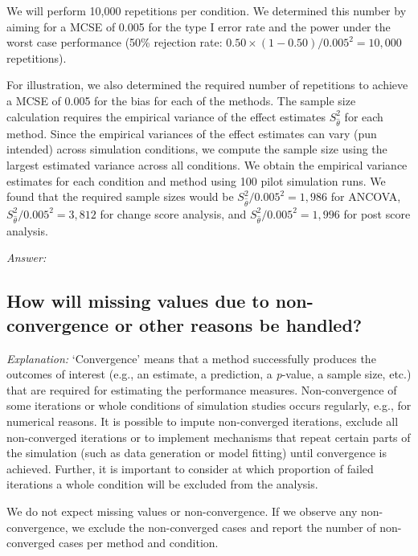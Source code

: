 \documentclass[12pt]{article}
\begin{document}
\begin{examplebox}
We will perform 10,000 repetitions per condition. We determined this number by aiming for a MCSE of 0.005 for the type I error rate and the power under the worst case performance (50\% rejection rate: $0.50 \times (1 - 0.50) / 0.005^2 = 10{,}000$ repetitions).

For illustration, we also determined the required number of repetitions to achieve a MCSE of 0.005 for the bias for each of the methods. The sample size calculation requires the empirical variance of the effect estimates $S_{\hat{\theta}}^2$ for each method. Since the empirical variances of the effect estimates can vary (pun intended) across simulation conditions, we compute the sample size using the largest estimated variance across all conditions. We obtain the empirical variance estimates for each condition and method using 100 pilot simulation runs. We found that the required sample sizes would be $S_{\hat{\theta}}^2/0.005^2 = 1{,}986$ for ANCOVA, $S_{\hat{\theta}}^2/0.005^2 = 3{,}812$ for change score analysis, and $S_{\hat{\theta}}^2/0.005^2 = 1{,}996$ for post score analysis.
\end{examplebox}

\textit{Answer:}




\subsection{How will missing values due to non-convergence or other reasons be handled?}

\textit{Explanation:} `Convergence' means that a method successfully produces the outcomes of interest (e.g., an estimate, a prediction, a \textit{p}-value, a sample size, etc.) that are required for estimating the performance measures. Non-convergence of some iterations or whole conditions of simulation studies occurs regularly, e.g., for numerical reasons. It is possible to impute non-converged iterations, exclude all non-converged iterations or to implement mechanisms that repeat certain parts of the simulation (such as data generation or model fitting) until convergence is achieved. Further, it is important to consider at which proportion of failed iterations a whole condition will be excluded from the analysis.

\begin{examplebox}
We do not expect missing values or non-convergence. If we observe any non-convergence, we exclude the non-converged cases and report the number of non-converged cases per method and condition.
\end{examplebox}
\end{document}
